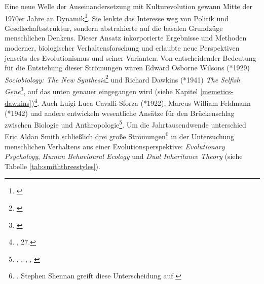 \documentclass[openany,twoside,twocolumn]{book}
\let\rmarkdownfootnote\footnote%
\def\footnote{\protect\rmarkdownfootnote}
\begin{document}
Eine neue Welle der Auseinandersetzung mit Kulturevolution gewann Mitte der 1970er Jahre an Dynamik\footnote{\textcite{creanza_cultural_2017}}. Sie lenkte das Interesse weg von Politik und Gesellschaftsstruktur, sondern abstrahierte auf die basalen Grundzüge menschlichen Denkens. Dieser Ansatz inkorporierte Ergebnisse und Methoden moderner, biologischer Verhaltensforschung und erlaubte neue Perspektiven jenseits des Evolutionismus und seiner Varianten. Von entscheidender Bedeutung für die Entstehung dieser Strömungen waren Edward Osborne Wilsons (*1929) \emph{Sociobiology: The New Synthesis}\footnote{\textcite{WilsonSociobiologynewsynthesis1975}} und Richard Dawkins (*1941) \emph{The Selfish Gene}\footnote{\textcite{Dawkinsselfishgene1976}}, auf das unten genauer eingegangen wird (siehe Kapitel \ref{memetics-dawkins})\footnote{\textcite{SmithThreestylesevolutionary2000}, 27.}. Auch Luigi Luca Cavalli-Sforza (*1922), Marcus William Feldmann (*1942) und andere entwickeln wesentliche Ansätze für den Brückenschlag zwischen Biologie und Anthropologie\footnote{\textcite{alland_cultural_1972}, \textcite{cavalli-sforza_models_1973}, \textcite{feldman_models_1975}, \textcite{feldman_cultural_1976}, \textcite{blum_uncertainty_1978}}. Um die Jahrtausendwende unterschied Eric Aldan Smith schließlich drei große Strömungen\footnote{\textcite{SmithThreestylesevolutionary2000}. Stephen Shennan greift diese Unterscheidung auf \autocite[15-18.]{ShennanGenesmemeshuman2002}} in der Untersuchung menschlichen Verhaltens aus einer Evolutionsperspektive: \emph{Evolutionary Psychology}, \emph{Human Behavioural Ecology} und \emph{Dual Inheritance Theory} (siehe Tabelle \ref{tab:smiththreestyles}).
\end{document}
